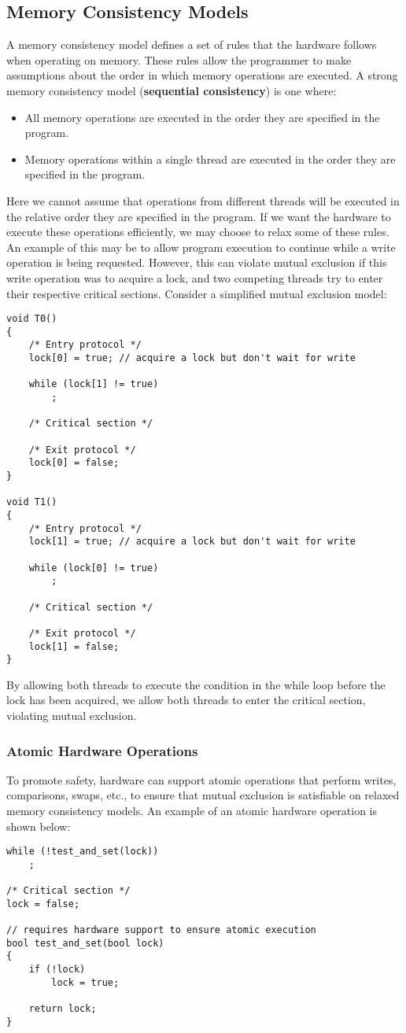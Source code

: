 \documentclass{article}
\begin{document}
\subsection{Memory Consistency Models}
A memory consistency model defines a set of rules that the hardware
follows when operating on memory. These rules allow the programmer to
make assumptions about the order in which memory operations are
executed. A strong memory consistency model (\textbf{sequential
consistency}) is one where:
\begin{itemize}
    \item All memory operations are executed in the order they are
          specified in the program.
    \item Memory operations within a single thread are executed in the
          order they are specified in the program.
\end{itemize}
Here we cannot assume that operations from different threads will
be executed in the relative order they are specified in the program.
If we want the hardware to execute these operations efficiently, we may
choose to relax some of these rules. An example of this may be to allow
program execution to continue while a write operation is being requested.
However, this can violate mutual exclusion if this write operation was
to acquire a lock, and two competing threads try to enter their
respective critical sections. Consider a simplified mutual exclusion
model:
\begin{verbatim}
void T0()
{
    /* Entry protocol */
    lock[0] = true; // acquire a lock but don't wait for write

    while (lock[1] != true)
        ;

    /* Critical section */

    /* Exit protocol */
    lock[0] = false;
}

void T1()
{
    /* Entry protocol */
    lock[1] = true; // acquire a lock but don't wait for write

    while (lock[0] != true)
        ;

    /* Critical section */

    /* Exit protocol */
    lock[1] = false;
}
\end{verbatim}
By allowing both threads to execute the condition in the while loop
before the lock has been acquired, we allow both threads to enter the
critical section, violating mutual exclusion.
\subsubsection{Atomic Hardware Operations}
To promote safety, hardware can support atomic operations that perform
writes, comparisons, swaps, etc., to ensure that mutual exclusion is
satisfiable on relaxed memory consistency models. An example of an
atomic hardware operation is shown below:
\begin{verbatim}
while (!test_and_set(lock))
    ;

/* Critical section */
lock = false;

// requires hardware support to ensure atomic execution
bool test_and_set(bool lock)
{
    if (!lock)
        lock = true;

    return lock;
}
\end{verbatim}
\end{document}
